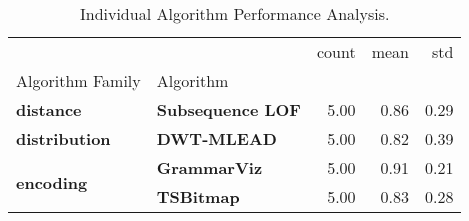 \begin{table}[h]
\centering
\caption{Individual Algorithm Performance Analysis.}
\label{tab:bp-trend}
\begin{tabular}{llrrr}
\toprule
 &  & count & mean & std \\
Algorithm Family & Algorithm &  &  &  \\
\midrule
\textbf{distance} & \textbf{Subsequence LOF} & 5.00 & 0.86 & 0.29 \\
\cline{1-5}
\textbf{distribution} & \textbf{DWT-MLEAD} & 5.00 & 0.82 & 0.39 \\
\cline{1-5}
\multirow[t]{2}{*}{\textbf{encoding}} & \textbf{GrammarViz} & 5.00 & 0.91 & 0.21 \\
\textbf{} & \textbf{TSBitmap} & 5.00 & 0.83 & 0.28 \\
\cline{1-5}
\bottomrule
\end{tabular}
\end{table}
